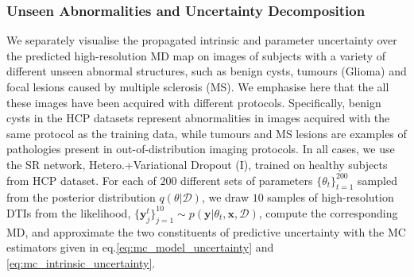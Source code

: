 

\subsubsection*{Unseen Abnormalities and Uncertainty Decomposition} \label{sec:unseen_abnormality}
We separately visualise the propagated intrinsic and parameter uncertainty over the predicted high-resolution MD map on images of subjects with a variety of different unseen abnormal structures, such as benign cysts, tumours (Glioma) and focal lesions caused by multiple sclerosis (MS). We emphasise here that the all these images have been acquired with different protocols. Specifically, benign cysts in the HCP datasets represent abnormalities in images acquired with the same protocol as the training data, while tumours and MS lesions are examples of pathologies present in out-of-distribution imaging protocols. In all cases, we use the SR network, Hetero.+Variational Dropout (I), trained on healthy subjects from HCP dataset. For each of $200$ different sets of parameters $\{\theta_{t}\}_{t=1}^{200}$ sampled from the posterior distribution $q(\theta|\mathcal{D})$,  we draw $10$ samples of high-resolution DTIs from the likelihood, $\{\mathbf{y}^{t}_{j}\}_{j=1}^{10} \sim p(\mathbf{y}|\theta_{t},\mathbf{x},\mathcal{D})$, compute the corresponding MD, and approximate the two constituents of predictive uncertainty with the MC estimators given in eq.\eqref{eq:mc_model_uncertainty} and \eqref{eq:mc_intrinsic_uncertainty}. 

